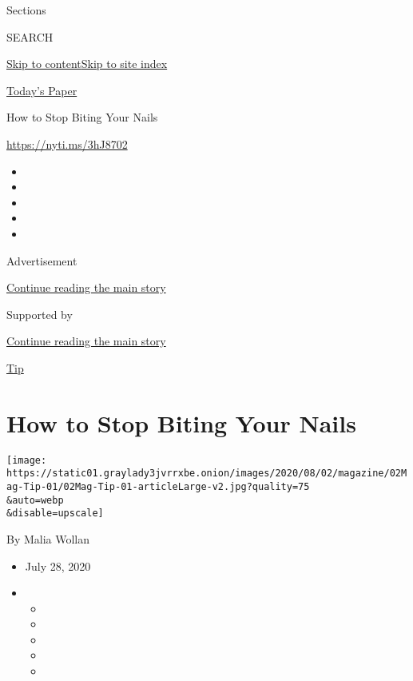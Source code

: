 Sections

SEARCH

\protect\hyperlink{site-content}{Skip to
content}\protect\hyperlink{site-index}{Skip to site index}

\href{https://myaccount.nytimes3xbfgragh.onion/auth/login?response_type=cookie\&client_id=vi}{}

\href{https://www.nytimes3xbfgragh.onion/section/todayspaper}{Today's
Paper}

How to Stop Biting Your Nails

\url{https://nyti.ms/3hJ8702}

\begin{itemize}
\item
\item
\item
\item
\item
\end{itemize}

Advertisement

\protect\hyperlink{after-top}{Continue reading the main story}

Supported by

\protect\hyperlink{after-sponsor}{Continue reading the main story}

\href{/column/magazine-tip}{Tip}

\hypertarget{how-to-stop-biting-your-nails}{%
\section{How to Stop Biting Your
Nails}\label{how-to-stop-biting-your-nails}}

\texttt{[image: https://static01.graylady3jvrrxbe.onion/images/2020/08/02/magazine/02Mag-Tip-01/02Mag-Tip-01-articleLarge-v2.jpg?quality=75\\\&auto=webp\\\&disable=upscale]}

By Malia Wollan

\begin{itemize}
\item
  July 28, 2020
\item
  \begin{itemize}
  \item
  \item
  \item
  \item
  \item
  \end{itemize}
\end{itemize}

